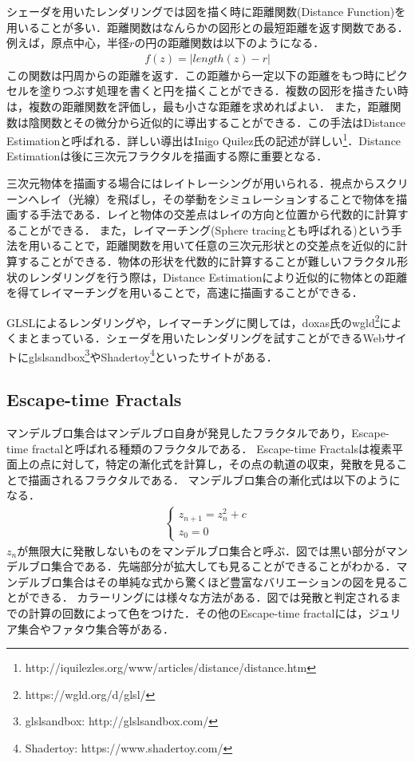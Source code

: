 シェーダを用いたレンダリングでは図を描く時に距離関数(Distance Function)を用いることが多い．距離関数はなんらかの図形との最短距離を返す関数である．例えば，原点中心，半径$r$の円の距離関数は以下のようになる．
\begin{eqnarray*}
 f(z) = | length(z) - r |
\end{eqnarray*}
この関数は円周からの距離を返す．この距離から一定以下の距離をもつ時にピクセルを塗りつぶす処理を書くと円を描くことができる．複数の図形を描きたい時は，複数の距離関数を評価し，最も小さな距離を求めればよい．
また，距離関数は陰関数とその微分から近似的に導出することができる．この手法はDistance Estimationと呼ばれる．詳しい導出はInigo Quilez氏の記述が詳しい\footnote{http://iquilezles.org/www/articles/distance/distance.htm}．Distance Estimationは後に三次元フラクタルを描画する際に重要となる．

三次元物体を描画する場合にはレイトレーシングが用いられる．視点からスクリーンへレイ（光線）を飛ばし，その挙動をシミュレーションすることで物体を描画する手法である．レイと物体の交差点はレイの方向と位置から代数的に計算することができる．
また，レイマーチング(Sphere tracingとも呼ばれる)\cite{sphereTracing}という手法を用いることで，距離関数を用いて任意の三次元形状との交差点を近似的に計算することができる．物体の形状を代数的に計算することが難しいフラクタル形状のレンダリングを行う際は，Distance Estimationにより近似的に物体との距離を得てレイマーチングを用いることで，高速に描画することができる．

GLSLによるレンダリングや，レイマーチングに関しては，doxas氏のwgld\footnote{https://wgld.org/d/glsl/}によくまとまっている．シェーダを用いたレンダリングを試すことができるWebサイトにglslsandbox\footnote{glslsandbox: http://glslsandbox.com/}やShadertoy\footnote{Shadertoy: https://www.shadertoy.com/}といったサイトがある．

\subsection{Escape-time Fractals}
マンデルブロ集合はマンデルブロ自身が発見したフラクタルであり，Escape-time fractalと呼ばれる種類のフラクタルである．
Escape-time Fractalsは複素平面上の点に対して，特定の漸化式を計算し，その点の軌道の収束，発散を見ることで描画されるフラクタルである．
マンデルブロ集合の漸化式は以下のようになる．
\begin{eqnarray*}
 \begin{cases}
  z_{n+1} = z^2_{n} + c \\ z_0 = 0
 \end{cases}
\end{eqnarray*}
$z_n$が無限大に発散しないものをマンデルブロ集合と呼ぶ．図では黒い部分がマンデルブロ集合である．先端部分が拡大しても見ることができることがわかる．マンデルブロ集合はその単純な式から驚くほど豊富なバリエーションの図を見ることができる．
カラーリングには様々な方法がある．図では発散と判定されるまでの計算の回数によって色をつけた．その他のEscape-time fractalには，ジュリア集合やファタウ集合等がある．

